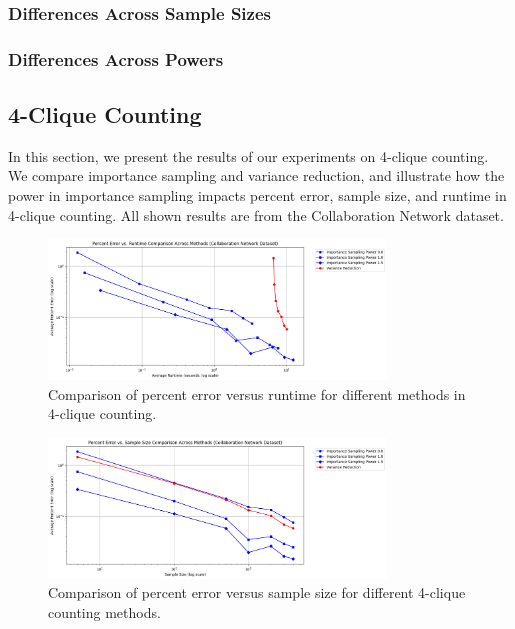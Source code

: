 \documentclass[11pt]{article}
\begin{document}
\subsubsection{Differences Across Sample Sizes}

\subsubsection{Differences Across Powers}

\subsection{4-Clique Counting}

In this section, we present the results of our experiments on 4-clique counting.
We compare importance sampling and variance reduction, and illustrate how the power in importance sampling impacts percent error, sample size, and runtime in 4-clique counting.
All shown results are from the Collaboration Network dataset.

\begin{figure}[H]
    \centering
    \includegraphics[width=0.8\textwidth]{plots/4-clique/comparison/percent_error_vs_runtime_comparison.png}
    \caption{Comparison of percent error versus runtime for different methods in 4-clique counting.}
    \label{fig:4_clique_percent_error_runtime_comparison}
\end{figure}

\begin{figure}[H]
    \centering
    \includegraphics[width=0.8\textwidth]{plots/4-clique/comparison/percent_error_vs_sample_size_comparison.png}
    \caption{Comparison of percent error versus sample size for different 4-clique counting methods.}
    \label{fig:4_clique_percent_error_sample_size_comparison}
\end{figure}
\end{document}

